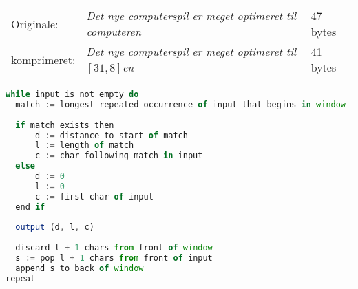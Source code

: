 \documentclass[12pt]{article}
\begin{document}
\begin{tabular}{lll}
  Originale: & \textit{Det nye computerspil er meget optimeret til computeren} & 47 bytes \\
  komprimeret: & \textit{Det nye computerspil er meget optimeret til $[31,8]$en} & 41 bytes
\end{tabular}
\newpage
\begin{lstlisting}[language=JavaScript, caption=LZ77 Pseudocode teoritisk]
while input is not empty do
  match := longest repeated occurrence of input that begins in window
  
  if match exists then
      d := distance to start of match
      l := length of match
      c := char following match in input
  else
      d := 0
      l := 0
      c := first char of input
  end if
  
  output (d, l, c)
  
  discard l + 1 chars from front of window
  s := pop l + 1 chars from front of input
  append s to back of window
repeat

\end{lstlisting}
\printbibliography[title={Litteraturliste}]
\end{document}
